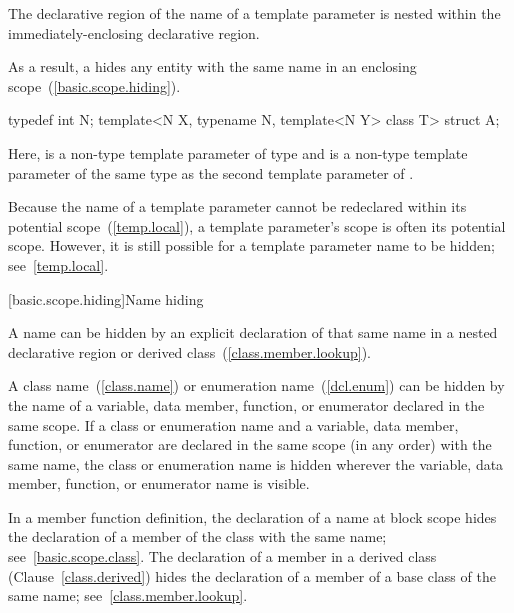 \pnum
The declarative region of the name of a template parameter is nested within the
immediately-enclosing declarative region. \begin{note} As a result, a
 hides any entity with the same name in an enclosing
scope~(\ref{basic.scope.hiding}). \begin{example}

\begin{codeblock}
typedef int N;
template<N X, typename N, template<N Y> class T> struct A;
\end{codeblock}

Here,  is a non-type template parameter of type  and  is a
non-type template parameter of the same type as the second template parameter of
. \end{example}\end{note}

\pnum
\begin{note} Because the name of a template parameter cannot be redeclared within its
potential scope~(\ref{temp.local}), a template parameter's scope is often its potential
scope. However, it is still possible for a template parameter name to be hidden;
see~\ref{temp.local}. \end{note}

[basic.scope.hiding]{Name hiding}

\pnum
{}%
%
%
A name can be hidden by an explicit declaration of that same name in a
nested declarative region or derived class~(\ref{class.member.lookup}).

\pnum
{}%
A class name~(\ref{class.name}) or enumeration name~(\ref{dcl.enum}) can
be hidden by the name of a variable, data member, function, or enumerator declared in
the same scope. If a class or enumeration name and a variable, data member, function,
or enumerator are declared in the same scope (in any order) with the
same name, the class or enumeration name is hidden wherever the variable, data member,
function, or enumerator name is visible.

\pnum
In a member function definition, the declaration of a name
at block scope
hides
the declaration of a member of the class with the same name;
see~\ref{basic.scope.class}. The declaration of a member in a derived
class (Clause~\ref{class.derived}) hides the declaration of a member of
a base class of the same name; see~\ref{class.member.lookup}.

